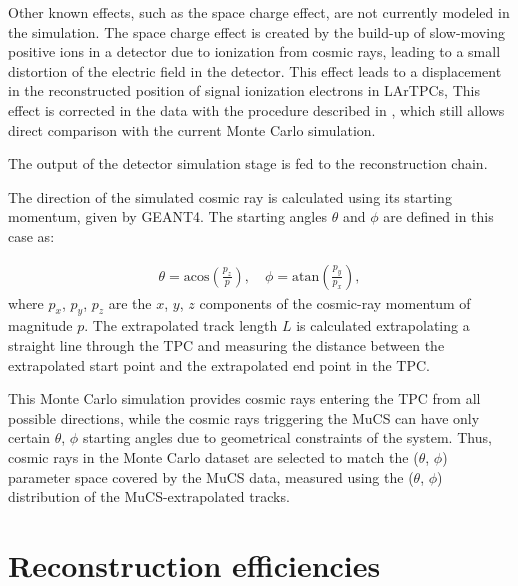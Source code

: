 \documentclass[a4paper,11pt]{article}
\begin{document}
Other known effects, such as the space charge effect, are not currently modeled in the simulation. The space charge effect is created by the build-up of slow-moving positive ions in a detector due to ionization from cosmic rays, leading to a small distortion of the electric field in the detector. This effect leads to a displacement in the reconstructed position of signal ionization electrons in LArTPCs, This effect is corrected in the data with the procedure described in \cite{sce}, which still allows direct comparison with the current Monte Carlo simulation.

The output of the detector simulation stage is fed to the reconstruction chain.

The direction of the simulated cosmic ray is calculated using its starting momentum, given by GEANT4. The starting angles $\theta$ and $\phi$ are defined in this case as:

\begin{align}\label{eq:angles_mc}
  \theta = \mathrm{acos}\left(\frac{p_{z}}{p}\right), \quad
  \phi = \mathrm{atan}\left(\frac{p_{y}}{p_{x}}\right),
\end{align}
where $p_{x}$, $p_{y}$, $p_{z}$ are the $x$, $y$, $z$ components of the cosmic-ray momentum of magnitude $p$.
The extrapolated track length $L$ is calculated extrapolating a straight line through the TPC and measuring the distance between the extrapolated start point and the extrapolated end point in the TPC.

This Monte Carlo simulation provides cosmic rays entering the TPC from all possible directions, while the cosmic rays triggering the MuCS can have only certain $\theta$, $\phi$ starting angles due to geometrical constraints of the system. Thus, cosmic rays in the Monte Carlo dataset are selected to match the ($\theta$, $\phi$) parameter space covered by the MuCS data, measured using the ($\theta$, $\phi$) distribution of the MuCS-extrapolated tracks.


\section{Reconstruction efficiencies}\label{sec:reco}
\end{document}
